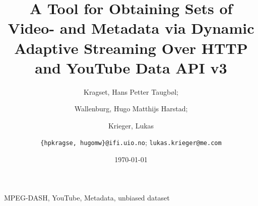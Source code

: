 \documentclass[10pt,journal]{IEEEtran}
\title{A Tool for Obtaining Sets of Video- and Metadata via Dynamic Adaptive
Streaming Over HTTP and YouTube Data API v3}
\author{
    Kragset, Hans Petter Taugb\o l;
    \and
    Wallenburg, Hugo Matthijs Harstad;
    \and
    Krieger, Lukas
    \and
    \newline
    \texttt{\{hpkragse, hugomw\}@ifi.uio.no};
    \texttt{lukas.krieger@me.com}
}
\date{\today}
\begin{document}
\maketitle



\begin{IEEEkeywords}
    MPEG-DASH, YouTube, Metadata, unbiased dataset
\end{IEEEkeywords}





















\end{document}
